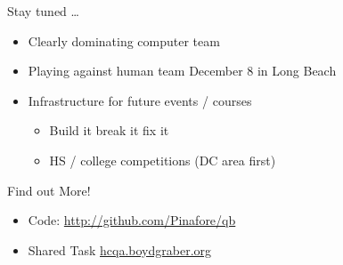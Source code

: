 \documentclass[xcolor=dvipsnames]{beamer}
\begin{document}
\begin{frame}{Stay tuned \dots}

  \begin{itemize}
    \item Clearly dominating computer team
    \item Playing against human team December 8 in Long Beach
    \item Infrastructure for future events / courses
      \begin{itemize}
        \item Build it break it fix it
        \item HS / college competitions (DC area first)
      \end{itemize}
  \end{itemize}

\end{frame}





\begin{frame}{Find out More!}

		\begin{itemize}
			\item Code: \url{http://github.com/Pinafore/qb}
                        \item Shared Task \url{hcqa.boydgraber.org}
		\end{itemize}

\end{frame}


\end{document}
